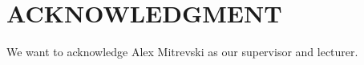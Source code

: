 \documentclass[../report.tex]{subfiles}
\begin{document}
\section*{ACKNOWLEDGMENT}

We want to acknowledge Alex Mitrevski as our supervisor and lecturer.
\end{document}
